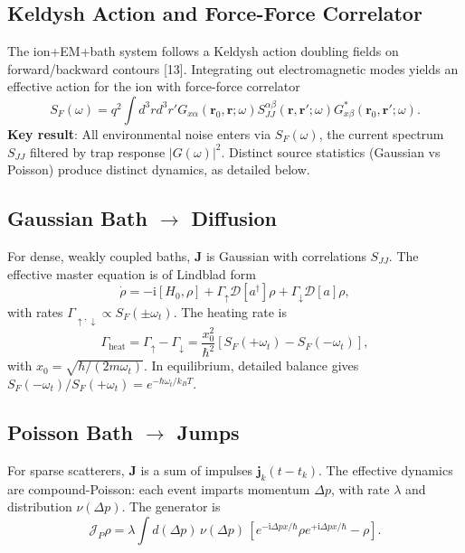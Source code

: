 \subsection{Keldysh Action and Force-Force Correlator}
The ion+EM+bath system follows a Keldysh action doubling fields on forward/backward contours [13]. Integrating out electromagnetic modes yields an effective action for the ion with force-force correlator
\begin{equation}
S_F(\omega) = q^2 \int d^3r d^3r' G_{x\alpha}(\mathbf{r}_0, \mathbf{r}; \omega) S^{\alpha\beta}_{JJ}(\mathbf{r}, \mathbf{r}'; \omega) G^*_{x\beta}(\mathbf{r}_0, \mathbf{r}'; \omega).
\end{equation}
\textbf{Key result}: All environmental noise enters via $S_F(\omega)$, the current spectrum $S_{JJ}$ filtered by trap response $|G(\omega)|^2$. Distinct source statistics (Gaussian vs Poisson) produce distinct dynamics, as detailed below.

\subsection{Gaussian Bath $\to$ Diffusion}
For dense, weakly coupled baths, $\mathbf{J}$ is Gaussian with correlations $S_{JJ}$.
The effective master equation is of Lindblad form
\begin{equation}
\dot{\rho} = -\mathrm{i}[H_0,\rho] + \Gamma_\uparrow \mathcal{D}[a^\dagger]\rho + \Gamma_\downarrow \mathcal{D}[a]\rho,
\end{equation}
with rates $\Gamma_{\uparrow,\downarrow} \propto S_F(\pm\omega_t)$.
The heating rate is
\begin{equation}
\Gamma_{\text{heat}} = \Gamma_\uparrow - \Gamma_\downarrow = \frac{x_0^2}{\hbar^2}\left[S_F(+\omega_t) - S_F(-\omega_t)\right],
\end{equation}
with $x_0=\sqrt{\hbar/(2m\omega_t)}$.
In equilibrium, detailed balance gives $S_F(-\omega_t)/S_F(+\omega_t)=e^{-\hbar\omega_t/k_BT}$.

\subsection{Poisson Bath $\to$ Jumps}
For sparse scatterers, $\mathbf{J}$ is a sum of impulses $\mathbf{j}_k(t-t_k)$.
The effective dynamics are compound-Poisson: each event imparts momentum $\Delta p$, with rate $\lambda$ and distribution $\nu(\Delta p)$.
The generator is
\begin{equation}
\mathcal{J}_P\rho = \lambda \int d(\Delta p)\, \nu(\Delta p)\,\left[e^{-\mathrm{i}\Delta p x/\hbar}\rho e^{+\mathrm{i}\Delta p x/\hbar}-\rho\right].
\end{equation}


